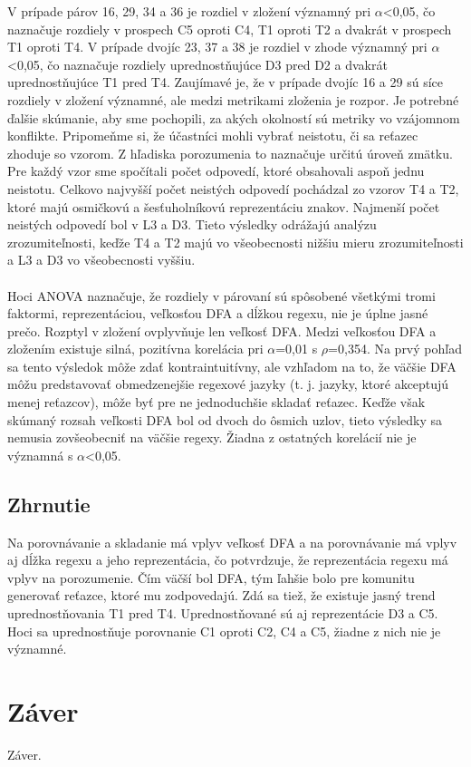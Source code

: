 \documentclass[10pt,twoside,slovak,a4paper]{article}
\begin{document}
V prípade párov 16, 29, 34 a 36 je rozdiel v zložení významný pri $\alpha$\textless0,05, čo naznačuje rozdiely v prospech C5 oproti C4, T1 oproti T2 a dvakrát v prospech T1 oproti T4. V prípade dvojíc 23, 37 a 38 je rozdiel v zhode významný pri $\alpha$\textless0,05, čo naznačuje rozdiely uprednostňujúce D3 pred D2 a dvakrát uprednostňujúce T1 pred T4. Zaujímavé je, že v prípade dvojíc 16 a 29 sú síce rozdiely v zložení významné, ale medzi metrikami zloženia je rozpor. Je potrebné ďalšie skúmanie, aby sme pochopili, za akých okolností sú metriky vo vzájomnom konflikte. Pripomeňme si, že účastníci mohli vybrať neistotu, či sa reťazec zhoduje so vzorom. Z hľadiska porozumenia to naznačuje určitú úroveň zmätku. Pre každý vzor sme spočítali počet odpovedí, ktoré obsahovali aspoň jednu neistotu. Celkovo najvyšší počet neistých odpovedí pochádzal zo vzorov T4 a T2, ktoré majú osmičkovú a šesťuholníkovú reprezentáciu znakov. Najmenší počet neistých odpovedí bol v L3 a D3. Tieto výsledky odrážajú analýzu zrozumiteľnosti, keďže T4 a T2 majú vo všeobecnosti nižšiu mieru zrozumiteľnosti a L3 a D3 vo všeobecnosti vyššiu.\cite{Chapman2017}\\\\

Hoci ANOVA naznačuje, že rozdiely v párovaní sú spôsobené všetkými tromi faktormi, reprezentáciou, veľkosťou DFA a dĺžkou regexu, nie je úplne jasné prečo. Rozptyl v zložení ovplyvňuje len veľkosť DFA. Medzi veľkosťou DFA a zložením existuje silná, pozitívna korelácia pri $\alpha$=0,01 s $\rho$=0,354. Na prvý pohľad sa tento výsledok môže zdať kontraintuitívny, ale vzhľadom na to, že väčšie DFA môžu predstavovať obmedzenejšie regexové jazyky (t. j. jazyky, ktoré akceptujú menej reťazcov), môže byť pre ne jednoduchšie skladať reťazec. Keďže však skúmaný rozsah veľkosti DFA bol od dvoch do ôsmich uzlov, tieto výsledky sa nemusia zovšeobecniť na väčšie regexy. Žiadna z ostatných korelácií nie je významná s $\alpha$\textless0,05.\cite{Chapman2017}

\subsection{Zhrnutie}
Na porovnávanie a skladanie má vplyv veľkosť DFA a na porovnávanie má vplyv aj dĺžka regexu a jeho reprezentácia, čo potvrdzuje, že reprezentácia regexu má vplyv na porozumenie. Čím väčší bol DFA, tým ľahšie bolo pre komunitu generovať reťazce, ktoré mu zodpovedajú. Zdá sa tiež, že existuje jasný trend uprednostňovania T1 pred T4. Uprednostňované sú aj reprezentácie D3 a C5. Hoci sa uprednostňuje porovnanie C1 oproti C2, C4 a C5, žiadne z nich nie je významné.\cite{Chapman2017}

\section{Záver} \label{zaver} %
Záver.




\end{document}
